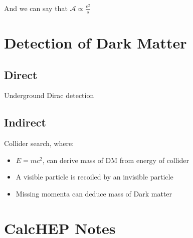 \documentclass[11pt,a4paper]{article}
\begin{document}
And we can say that $\mathscr{A} \propto \frac{e^2}{s}$

\section{Detection of Dark Matter}
\subsection{Direct}
Underground Dirac detection
\subsection{Indirect}
Collider search, where:
\begin{itemize}
    \item $E = mc^2$, can derive mass of DM from energy of collider
    \item A visible particle is recoiled by an invisible particle
    \item Missing momenta can deduce mass of Dark matter
\end{itemize}
\section{}

\section{CalcHEP Notes}
\end{document}
